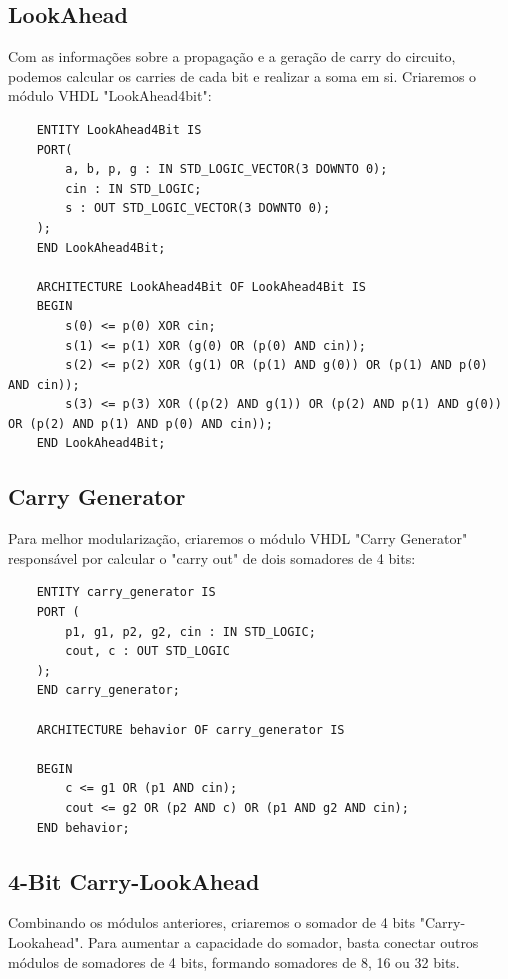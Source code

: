 \documentclass[12pt]{article}
\begin{document}
\subsection{LookAhead}

Com as informações sobre a propagação e a geração de carry do circuito, podemos calcular os carries de cada bit e realizar a soma em si. Criaremos o módulo VHDL "LookAhead4bit":

\begin{lstlisting}
    ENTITY LookAhead4Bit IS
    PORT(
        a, b, p, g : IN STD_LOGIC_VECTOR(3 DOWNTO 0);
        cin : IN STD_LOGIC;
        s : OUT STD_LOGIC_VECTOR(3 DOWNTO 0);
    );
    END LookAhead4Bit;
    
    ARCHITECTURE LookAhead4Bit OF LookAhead4Bit IS
    BEGIN
        s(0) <= p(0) XOR cin;
        s(1) <= p(1) XOR (g(0) OR (p(0) AND cin));
        s(2) <= p(2) XOR (g(1) OR (p(1) AND g(0)) OR (p(1) AND p(0) AND cin));
        s(3) <= p(3) XOR ((p(2) AND g(1)) OR (p(2) AND p(1) AND g(0)) OR (p(2) AND p(1) AND p(0) AND cin));
    END LookAhead4Bit;
\end{lstlisting}

\subsection{Carry Generator}

Para melhor modularização, criaremos o módulo VHDL "Carry Generator" responsável por calcular o "carry out" de dois somadores de 4 bits:

\begin{lstlisting}
    ENTITY carry_generator IS
    PORT (
        p1, g1, p2, g2, cin : IN STD_LOGIC;
        cout, c : OUT STD_LOGIC
    );
    END carry_generator;
    
    ARCHITECTURE behavior OF carry_generator IS
    
    BEGIN
        c <= g1 OR (p1 AND cin);
        cout <= g2 OR (p2 AND c) OR (p1 AND g2 AND cin);
    END behavior;
\end{lstlisting}

\subsection{4-Bit Carry-LookAhead}

Combinando os módulos anteriores, criaremos o somador de 4 bits "Carry-Lookahead". Para aumentar a capacidade do somador, basta conectar outros módulos de somadores de 4 bits, formando somadores de 8, 16 ou 32 bits.
\end{document}

